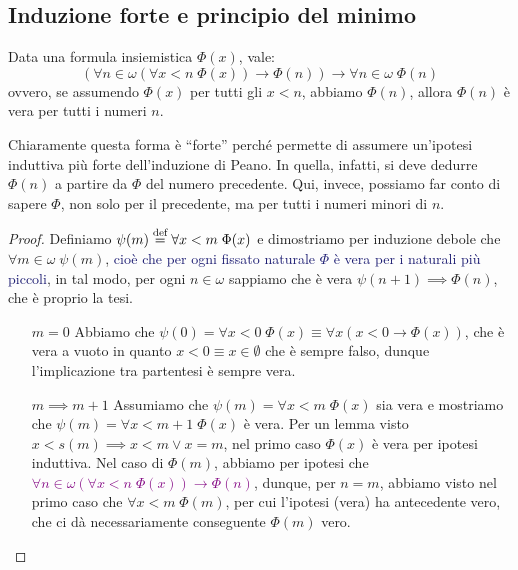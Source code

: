 \subsection{Induzione forte e principio del minimo}
\begin{theorem}
	Data una formula insiemistica $\Phi(x)$, vale:
	\[ (\forall n \in \omega (\forall x < n \; \Phi (x)) \rightarrow \Phi(n)) \rightarrow \forall n \in \omega \; \Phi(n)
		\]
	ovvero, se assumendo $\Phi(x)$ per tutti gli $x < n$, abbiamo $\Phi(n)$, allora $\Phi(n)$ è vera per tutti i numeri $n$.
\end{theorem}

\begin{remark}
	Chiaramente questa forma è ``forte'' perché permette di assumere un'ipotesi induttiva più forte dell'induzione di Peano. In quella, infatti, si deve dedurre $\Phi(n)$ a 
	partire da $\Phi$ del numero precedente. Qui, invece, possiamo far conto di sapere $\Phi$, non solo per il precedente, ma per tutti i numeri minori di $n$.
\end{remark}

\begin{proof}
	Definiamo $\psi(m) \overset{\text{def}}{=} \forall x < m \; \Phi(x)$ e dimostriamo per induzione debole che $\forall m \in \omega \; \psi(m)$, \textcolor{MidnightBlue}{ cioè che per ogni fissato naturale $\Phi$ è vera per i naturali più piccoli},
	in tal modo, per ogni $n \in \omega$ sappiamo che è vera $\psi(n+1) \implies \Phi(n)$, che è proprio la tesi.
	\begin{itemize}
		\item[$\boxed{m = 0}$] Abbiamo che $\psi(0) = \forall x < 0 \; \Phi(x) \equiv \forall x (x < 0 \to \Phi(x))$, che è vera a vuoto in quanto $x < 0 \equiv x \in \emptyset$ che è sempre falso, dunque l'implicazione tra partentesi è sempre vera.
		\item[$\boxed{m \implies m + 1}$] Assumiamo che $\psi(m) = \forall x < m \; \Phi(x)$ sia vera e mostriamo che $\psi(m) = \forall x < m + 1 \; \Phi(x)$ è vera. Per un lemma visto $x < s(m) \implies x < m \lor x = m$, nel primo caso $\Phi(x)$ è vera per ipotesi induttiva.
		Nel caso di $\Phi(m)$, abbiamo per ipotesi che \textcolor{purple}{$\forall n \in \omega (\forall x < n \; \Phi (x)) \rightarrow \Phi(n)$}, dunque, per $n = m$, abbiamo visto nel primo caso che $\forall x < m \; \Phi(m)$, per cui l'ipotesi (vera) ha antecedente vero, che ci dà necessariamente conseguente $\Phi(m)$ vero.
	\end{itemize}
\end{proof}

